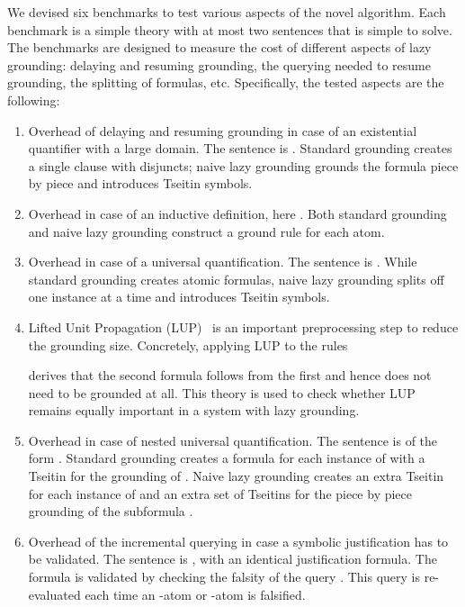 \documentclass[11pt]{article}
\theoremstyle{plain}
\theoremstyle{definition}
\theoremstyle{example_basic}
\theoremstyle{example_contd}
\theoremstyle{plain}
\newcommand{\change}[1]{#1}
\begin{document}
We devised six benchmarks to test various aspects of the novel algorithm. Each benchmark is a simple theory with at most two sentences that is simple to solve. The benchmarks are designed to measure the cost of different aspects of lazy grounding:  delaying and resuming grounding, the  querying needed to resume grounding,  the  splitting of formulas, etc. Specifically, the tested aspects are the following:
\begin{enumerate}
\item \change{Overhead of delaying and resuming grounding in case of
    an existential quantifier with a large domain. The sentence is
    . Standard grounding creates a single
    clause with  disjuncts; naive lazy grounding grounds the
    formula piece by piece and introduces  Tseitin symbols.}
\item \change{Overhead in case of an inductive definition, here
    . Both
    standard grounding and naive lazy grounding construct a ground
    rule for each  atom.}
\item \change{Overhead in case of a universal quantification. The
    sentence is . While standard grounding
    creates  atomic formulas, naive lazy grounding splits off one
    instance at a time and introduces  Tseitin symbols.}
\item \change{Lifted Unit Propagation
    (LUP)~\cite{jair/WittocxMD10,acm/wittocx} is an important preprocessing step to reduce the grounding size. Concretely, applying LUP to the rules}
  
  \change{derives that the second formula follows from the first and
    hence does not need to be grounded at all. This theory is used to
    check whether LUP remains equally important in a system with lazy
    grounding.}
\item \change{Overhead in case of nested universal quantification. The
  sentence is of the form . Standard grounding creates a formula for each
  instance  of  with a Tseitin for the grounding of . Naive lazy grounding creates an extra
  Tseitin for each instance  of  and an extra set of
  Tseitins for the piece by piece grounding of the subformula .}
\item \change{Overhead of the incremental querying in case a symbolic justification has to be validated. The sentence is , with an identical justification formula. The formula is validated by checking the falsity of the query . This query is re-evaluated each time an -atom or -atom is falsified.}
\end{enumerate}
\end{document}
